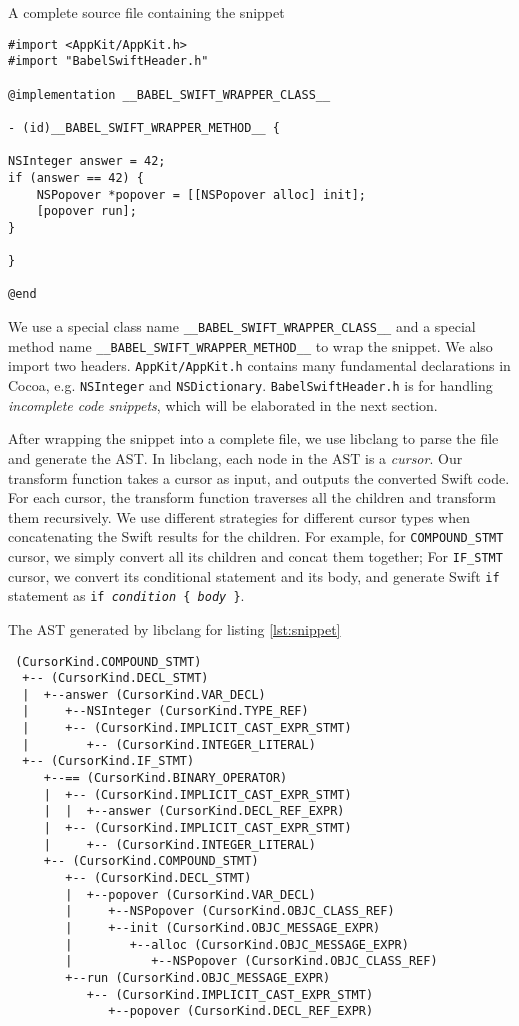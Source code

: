 \documentclass{sfuthesis}
\begin{document}
\begin{listing}
\caption{A complete source file containing the snippet}	
\label{lst:snippet}
\begin{verbatim}
#import <AppKit/AppKit.h>
#import "BabelSwiftHeader.h"

@implementation __BABEL_SWIFT_WRAPPER_CLASS__

- (id)__BABEL_SWIFT_WRAPPER_METHOD__ {

NSInteger answer = 42;
if (answer == 42) {
    NSPopover *popover = [[NSPopover alloc] init];
    [popover run];
}

}

@end
\end{verbatim}
\end{listing}

We use a special class name \texttt{\_\_BABEL\_SWIFT\_WRAPPER\_CLASS\_\_} and a special method name \texttt{\_\_BABEL\_SWIFT\_WRAPPER\_METHOD\_\_} to wrap the snippet. We also import two headers. \texttt{AppKit/AppKit.h} contains many fundamental declarations in Cocoa, e.g. \texttt{NSInteger} and \texttt{NSDictionary}. \texttt{BabelSwiftHeader.h} is for handling \emph{incomplete code snippets}, which will be elaborated in the next section.

After wrapping the snippet into a complete file, we use libclang to parse the file and generate the AST. In libclang, each node in the AST is a \emph{cursor}. Our transform function takes a cursor as input, and outputs the converted Swift code. For each cursor, the transform function traverses all the children and transform them recursively. We use different strategies for different cursor types when concatenating the Swift results for the children. For example, for \texttt{COMPOUND\_STMT} cursor, we simply convert all its children and concat them together; For \texttt{IF\_STMT} cursor, we convert its conditional statement and its body, and generate Swift \texttt{if} statement as \texttt{if \emph{condition} \{ \emph{body} \}}.

\begin{listing}[H]
\caption{The AST generated by libclang for listing \ref{lst:snippet}}
\begin{verbatim}
 (CursorKind.COMPOUND_STMT)
  +-- (CursorKind.DECL_STMT)
  |  +--answer (CursorKind.VAR_DECL)
  |     +--NSInteger (CursorKind.TYPE_REF)
  |     +-- (CursorKind.IMPLICIT_CAST_EXPR_STMT)
  |        +-- (CursorKind.INTEGER_LITERAL)
  +-- (CursorKind.IF_STMT)
     +--== (CursorKind.BINARY_OPERATOR)
     |  +-- (CursorKind.IMPLICIT_CAST_EXPR_STMT)
     |  |  +--answer (CursorKind.DECL_REF_EXPR)
     |  +-- (CursorKind.IMPLICIT_CAST_EXPR_STMT)
     |     +-- (CursorKind.INTEGER_LITERAL)
     +-- (CursorKind.COMPOUND_STMT)
        +-- (CursorKind.DECL_STMT)
        |  +--popover (CursorKind.VAR_DECL)
        |     +--NSPopover (CursorKind.OBJC_CLASS_REF)
        |     +--init (CursorKind.OBJC_MESSAGE_EXPR)
        |        +--alloc (CursorKind.OBJC_MESSAGE_EXPR)
        |           +--NSPopover (CursorKind.OBJC_CLASS_REF)
        +--run (CursorKind.OBJC_MESSAGE_EXPR)
           +-- (CursorKind.IMPLICIT_CAST_EXPR_STMT)
              +--popover (CursorKind.DECL_REF_EXPR)
\end{verbatim}
\end{listing}
\end{document}
